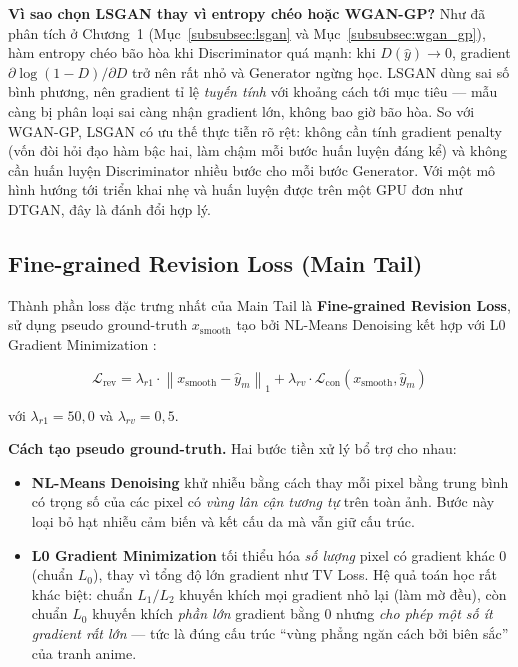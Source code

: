 \textbf{Vì sao chọn LSGAN thay vì entropy chéo hoặc WGAN-GP?} Như đã phân tích ở Chương~1 (Mục~\ref{subsubsec:lsgan} và Mục~\ref{subsubsec:wgan_gp}), hàm entropy chéo bão hòa khi Discriminator quá mạnh: khi $D(\widehat{y}) \to 0$, gradient $\partial \log(1 - D)/\partial D$ trở nên rất nhỏ và Generator ngừng học. LSGAN dùng sai số bình phương, nên gradient tỉ lệ \textit{tuyến tính} với khoảng cách tới mục tiêu --- mẫu càng bị phân loại sai càng nhận gradient lớn, không bao giờ bão hòa. So với WGAN-GP, LSGAN có ưu thế thực tiễn rõ rệt: không cần tính gradient penalty (vốn đòi hỏi đạo hàm bậc hai, làm chậm mỗi bước huấn luyện đáng kể) và không cần huấn luyện Discriminator nhiều bước cho mỗi bước Generator. Với một mô hình hướng tới triển khai nhẹ và huấn luyện được trên một GPU đơn như DTGAN, đây là đánh đổi hợp lý.

\subsection{Fine-grained Revision Loss (Main Tail)}
\label{subsec:revision_loss}

Thành phần loss đặc trưng nhất của Main Tail là \textbf{Fine-grained Revision Loss}, sử dụng pseudo ground-truth $x_{\text{smooth}}$ tạo bởi NL-Means Denoising \cite{Buades2005NLM} kết hợp với L0 Gradient Minimization \cite{Xu2011L0}:

\begin{equation}
\label{eq:revision_loss}
\mathcal{L}_{\text{rev}} = \lambda_{r1} \cdot \left\|x_{\text{smooth}} - \widehat{y}_m\right\|_1 + \lambda_{rv} \cdot \mathcal{L}_{\text{con}}(x_{\text{smooth}}, \widehat{y}_m)
\end{equation}

\noindent với $\lambda_{r1} = 50{,}0$ và $\lambda_{rv} = 0{,}5$.

\textbf{Cách tạo pseudo ground-truth.} Hai bước tiền xử lý bổ trợ cho nhau:
\begin{itemize}
    \item \textbf{NL-Means Denoising} khử nhiễu bằng cách thay mỗi pixel bằng trung bình có trọng số của các pixel có \textit{vùng lân cận tương tự} trên toàn ảnh. Bước này loại bỏ hạt nhiễu cảm biến và kết cấu da mà vẫn giữ cấu trúc.
    \item \textbf{L0 Gradient Minimization} tối thiểu hóa \textit{số lượng} pixel có gradient khác 0 (chuẩn $L_0$), thay vì tổng độ lớn gradient như TV Loss. Hệ quả toán học rất khác biệt: chuẩn $L_1/L_2$ khuyến khích mọi gradient nhỏ lại (làm mờ đều), còn chuẩn $L_0$ khuyến khích \textit{phần lớn} gradient bằng 0 nhưng \textit{cho phép một số ít gradient rất lớn} --- tức là đúng cấu trúc ``vùng phẳng ngăn cách bởi biên sắc'' của tranh anime.
\end{itemize}

